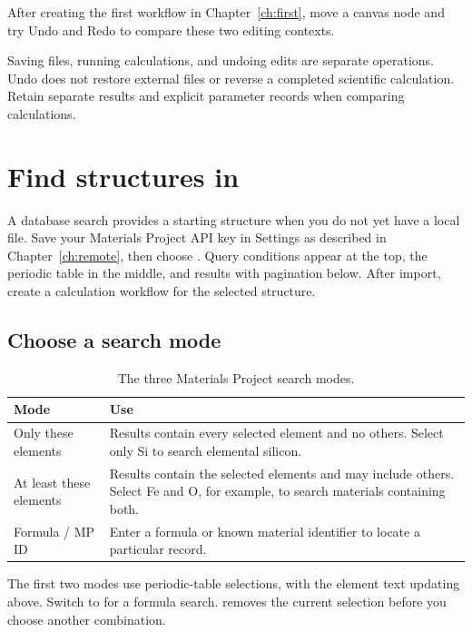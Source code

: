 After creating the first workflow in Chapter~\ref{ch:first}, move a canvas node and try Undo and Redo to compare these two editing contexts.

Saving files, running calculations, and undoing edits are separate operations. Undo does not restore external files or reverse a completed scientific calculation. Retain separate results and explicit parameter records when comparing calculations.

\section{Find structures in }\label{sec:mp-search}

A database search provides a starting structure when you do not yet have a local file. Save your Materials Project API key in Settings as described in Chapter~\ref{ch:remote}, then choose . Query conditions appear at the top, the periodic table in the middle, and results with pagination below. After import, create a calculation workflow for the selected structure.

\subsection{Choose a search mode}

\begin{table}[htbp]
\centering
\caption{The three Materials Project search modes.}
\begin{tabularx}{\linewidth}{lX}
\toprule
Mode & Use \\
\midrule
Only these elements & Results contain every selected element and no others. Select only Si to search elemental silicon. \\
At least these elements & Results contain the selected elements and may include others. Select Fe and O, for example, to search materials containing both. \\
Formula / MP ID & Enter a formula or known material identifier to locate a particular record. \\
\bottomrule
\end{tabularx}
\end{table}

The first two modes use periodic-table selections, with the element text updating above. Switch to  for a formula search.  removes the current selection before you choose another combination.

